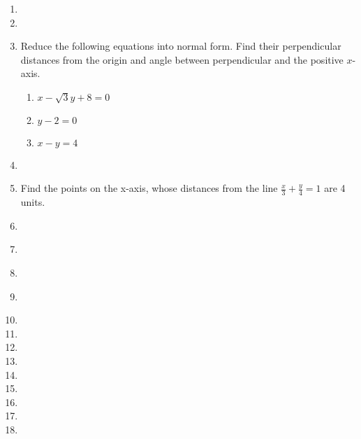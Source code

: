 \begin{enumerate}[label=\thesection.\arabic*,ref=\thesection.\theenumi]

\item 
\item 
\item  Reduce the following equations into normal form. Find their perpendicular distances from the origin and angle between perpendicular and the positive $x$-axis.
\label{chapters/11/10/3/3}
\begin{enumerate}
	\item $x-\sqrt{3}y+8=0$ 
	\item $y-2=0$
	\item $x-y=4$
\end{enumerate}
\solution

\item 
\label{chapters/11/10/3/4}

\item Find the points on the x-axis, whose distances from the line $\frac{x}{3}+\frac{y}{4}=1$ are 4 units.
\label{chapters/11/10/3/5}
	\\
	\solution

\item 
\item 
\label{chapters/11/10/3/7}

\item 
\item 
\label{chapters/11/10/3/9}

\item 
\item 
\item 
\item 
\item 
\item 
\item 
\item 
\item 

\end{enumerate}
